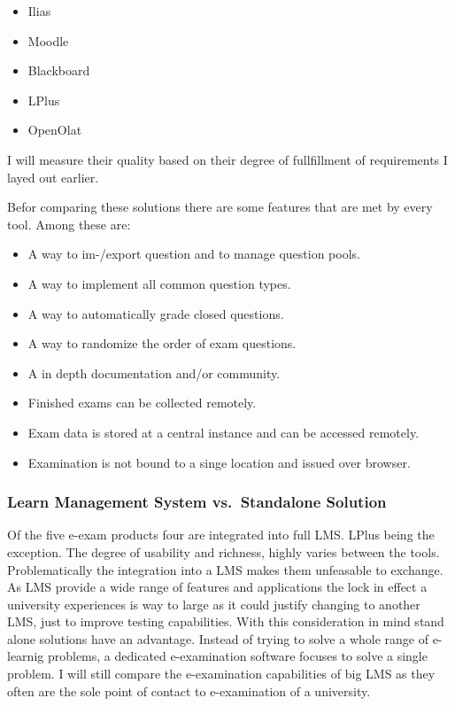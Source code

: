 \begin{itemize}
\tightlist
\item
  Ilias 
\item
  Moodle 
\item
  Blackboard 
\item
  LPlus 
\item
  OpenOlat 
\end{itemize}

I will measure their quality based on their degree of fullfillment of
requirements I layed out earlier.

Befor comparing these solutions there are some features that are met by
every tool. Among these are:

\begin{itemize}
\tightlist
\item
  A way to im-/export question and to manage question pools.
\item
  A way to implement all common question types.
\item
  A way to automatically grade closed questions.
\item
  A way to randomize the order of exam questions.
\item
  A in depth documentation and/or community.
\item
  Finished exams can be collected remotely.
\item
  Exam data is stored at a central instance and can be accessed
  remotely.
\item
  Examination is not bound to a singe location and issued over browser.
\end{itemize}

\hypertarget{learn-management-system-vs.-standalone-solution}{%
\subsubsection{Learn Management System vs.~Standalone
Solution}\label{learn-management-system-vs.-standalone-solution}}

Of the five e-exam products four are integrated into full LMS. LPlus
being the exception. The degree of usability and richness, highly varies
between the tools. Problematically the integration into a LMS makes them
unfeasable to exchange. As LMS provide a wide range of features and
applications the lock in effect a university experiences is way to large
as it could justify changing to another LMS, just to improve testing
capabilities. With this consideration in mind stand alone solutions have
an advantage. Instead of trying to solve a whole range of e-learnig
problems, a dedicated e-examination software focuses to solve a single
problem. I will still compare the e-examination capabilities of big LMS
as they often are the sole point of contact to e-examination of a
university.

